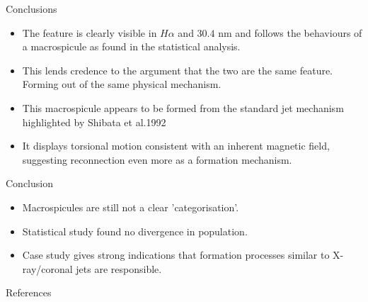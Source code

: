 \documentclass{beamer}
\begin{document}
	\begin{frame}{Conclusions}
		\begin{itemize}
			\item{The feature is clearly visible in $H\alpha$ and $30.4$ nm and follows the behaviours of a macrospicule as found in the statistical analysis.}
			\item{This lends credence to the argument that the two are the same feature. Forming out of the same physical mechanism.}
			\item{This macrospicule appears to be formed from the standard jet mechanism highlighted by Shibata et al.1992}
			\item{It displays torsional motion consistent with an inherent magnetic field, suggesting reconnection even more as a formation mechanism.}
		\end{itemize}
	\end{frame}



	\begin{frame}{Conclusion}
		\begin{itemize}
		\item{Macrospicules are still not a clear 'categorisation'.}
		\item{Statistical study found no divergence in population.}
		\item{Case study gives strong indications that formation processes similar to X-ray/coronal jets are responsible.}
		\end{itemize}
	\end{frame}

	\begin{frame}{References}
	\tiny
	
	
	\end{frame}
\end{document}
